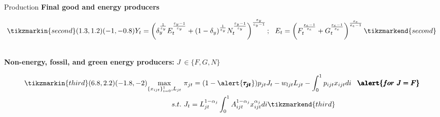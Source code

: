\documentclass[11pt,aspectratio=169]{beamer}
\begin{document}
\addtocounter{framenumber}{-1}
\begin{frame}{ Production}
	\textbf{Final good and energy producers }
	\vspace{-5mm}
	\begin{minipage}[t!]{1\textwidth}
		\begin{align*}
		\tikzmarkin{second}(1.3,1.2)(-1,-0.8)
		Y_t=\left(\delta_y^{\frac{1}{\varepsilon_y}}E_t^\frac{\varepsilon_y-1}{\varepsilon_y}+(1-\delta_y)^{\frac{1}{\varepsilon_y}}N_t^\frac{\varepsilon_y-1}{\varepsilon_y}\right)^\frac{\varepsilon_y}{\varepsilon_y-1}; \ \ 
		E_t=\left({F}_t^\frac{\varepsilon_e-1}{\varepsilon_e}+G_t^\frac{\varepsilon_e-1}{\varepsilon_e}\right)^\frac{\varepsilon_e}{\varepsilon_e-1}
		\tikzmarkend{second}
		\end{align*}
	\end{minipage}
	\\
	
	\vspace{12mm}
	\textbf{Non-energy, fossil, and green energy producers:} $J\ \in\{F,G,N\}$
	\vspace{-3mm}
	\begin{minipage}[t!]{1\textwidth}
		\begin{align*}
		\tikzmarkin{third}(6.8,2.2)(-1.8,-2)
		\underset{\{x_{ijt}\}_{i=0}^1, L_{jt}}{\max}\ & \pi_{jt}=(1-\alert{\pmb{\tau_{jt}}})p_{jt}J_t-w_{ljt}L_{jt}-\int_{0}^{1}p_{ijt}x_{ijt}di \hspace{3mm} \pmb{\alert{for\  J=F}}\\ 
		s.t.\ & J_{t}=L_{jt}^{1-\alpha_j}\int_{0}^{1}A^{1-\alpha_j}_{ijt}x_{ijt}^{\alpha_j}di
		\tikzmarkend{third}
		\end{align*}
	\end{minipage}
\end{frame}
\end{document}
